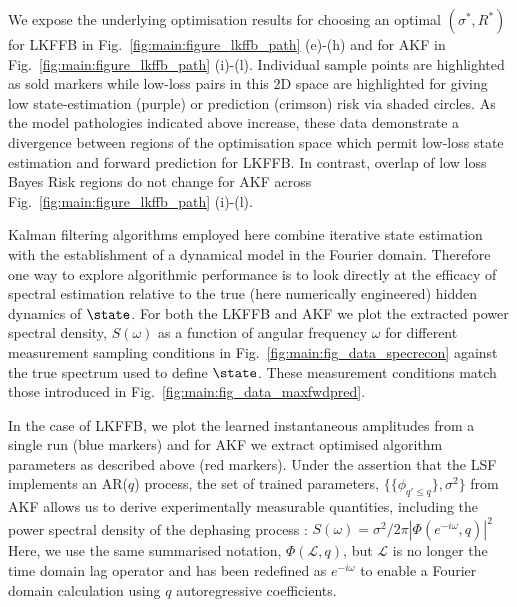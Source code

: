 {We expose the underlying optimisation results for choosing an optimal $(\sigma^*, R^*)$ for LKFFB in Fig.~\ref{fig:main:figure_lkffb_path} (e)-(h) and for AKF in Fig.~\ref{fig:main:figure_lkffb_path} (i)-(l). Individual sample points are highlighted as sold markers while low-loss pairs in this 2D space are highlighted for giving low state-estimation (purple) or prediction (crimson) risk via shaded circles.  As the model pathologies indicated above increase, these data demonstrate a divergence between regions of the optimisation space which permit low-loss state estimation and forward prediction for LKFFB.  In contrast, overlap of low loss Bayes Risk regions do not change for AKF across Fig.~\ref{fig:main:figure_lkffb_path} (i)-(l).



Kalman filtering algorithms employed here combine iterative state estimation with the establishment of a dynamical model in the Fourier domain.  Therefore one way to explore algorithmic performance is to look directly at the efficacy of spectral estimation relative to the true (here numerically engineered) hidden dynamics of $\state$.  For both the LKFFB and AKF we plot the extracted power spectral density, $S(\omega)$ as a function of angular frequency $\omega$ for different measurement sampling conditions in Fig.~\ref{fig:main:fig_data_specrecon} against the true spectrum used to define $\state$.  These measurement conditions match those introduced in Fig.~\ref{fig:main:fig_data_maxfwdpred}.

In the case of LKFFB, we plot the learned instantaneous amplitudes from a single run (blue markers) and for AKF we extract optimised algorithm parameters as described above (red markers). Under the assertion that the LSF implements an AR($q$) process, the set of trained parameters, $\{  \{\phi_{q' \leq q}\}, \sigma^2\}$ from AKF allows us to derive experimentally measurable quantities, including the power spectral density of the dephasing process \cite{brockwell1996introduction}:
$S(\omega) = \sigma^2/ 2 \pi |\Phi(e^{-i\omega}, q)|^2$ %
Here, we use the same summarised notation, $\Phi(\mathcal{L}, q)$, but  $\mathcal{L}$ is no longer the time domain lag operator and has been redefined as $e^{-i\omega}$ to enable a Fourier domain calculation using $q$ autoregressive coefficients. 

}
